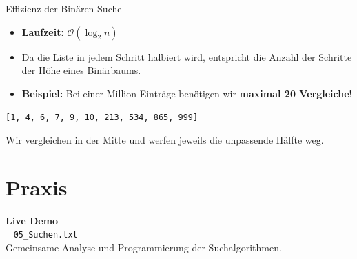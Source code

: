\documentclass[aspectratio=169,11pt]{beamer}
\begin{document}
\begin{frame}{Effizienz der Binären Suche}
    \begin{itemize}
        \item \textbf{Laufzeit:} $\mathcal{O}(\log_2 n)$
        \item Da die Liste in jedem Schritt halbiert wird, entspricht die Anzahl der Schritte der Höhe eines Binärbaums.
        \item \textbf{Beispiel:} Bei einer Million Einträge benötigen wir \textbf{maximal 20 Vergleiche}!
    \end{itemize}
    
    \vspace{0.5cm}
    \begin{center}
        \texttt{[1, 4, 6, 7, 9, 10, 213, 534, 865, 999]}
    \end{center}
    Wir vergleichen in der Mitte und werfen jeweils die unpassende Hälfte weg.
\end{frame}

\section{Praxis}

\begin{frame}[plain]
    \begin{center}
        \Huge \textbf{Live Demo} \\
        \vspace{0.5cm}
        \large \faLaptopCode~ \texttt{05\_Suchen.txt} \\
        \vspace{0.3cm}
        \normalsize Gemeinsame Analyse und Programmierung der Suchalgorithmen.
    \end{center}
\end{frame}
\end{document}
